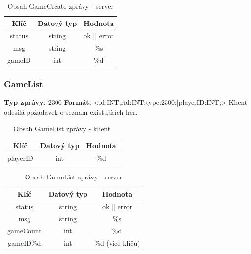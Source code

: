 \documentclass[12pt, a4paper]{article}
\begin{document}
    \begin{table}[H]
        \centering
        \begin{tabular}{|c|c|c|}
            \hline
            Klíč & Datový typ & Hodnota \\
            \hline
            \hline
            status & string & ok || error \\
            \hline
            msg & string & \%s \\
            \hline
            gameID & int & \%d \\
            \hline
        \end{tabular}
        \caption{Obsah GameCreate zprávy - server}
    \end{table}

\subsubsection{GameList}
\textbf{Typ zprávy: } 2300 \newline
\textbf{Formát: } \newline  <id:INT;rid:INT;type:2300;|playerID:INT;> \newline
Klient odesílá požadavek o seznam existujících her. \newline

    \begin{table}[H]
        \centering
        \begin{tabular}{|c|c|c|}
            \hline
            Klíč & Datový typ & Hodnota \\
            \hline
            \hline
            playerID & int & \%d \\
            \hline
        \end{tabular}
        \caption{Obsah GameList zprávy - klient}
    \end{table}

    \begin{table}[H]
        \centering
        \begin{tabular}{|c|c|c|}
            \hline
            Klíč & Datový typ & Hodnota \\
            \hline
            \hline
            status & string & ok || error \\
            \hline
            msg & string & \%s \\
            \hline
            gameCount & int & \%d \\
            \hline
            gameID\%d & int & \%d (více klíčů) \\
            \hline
        \end{tabular}
        \caption{Obsah GameList zprávy - server}
    \end{table}
\end{document}
